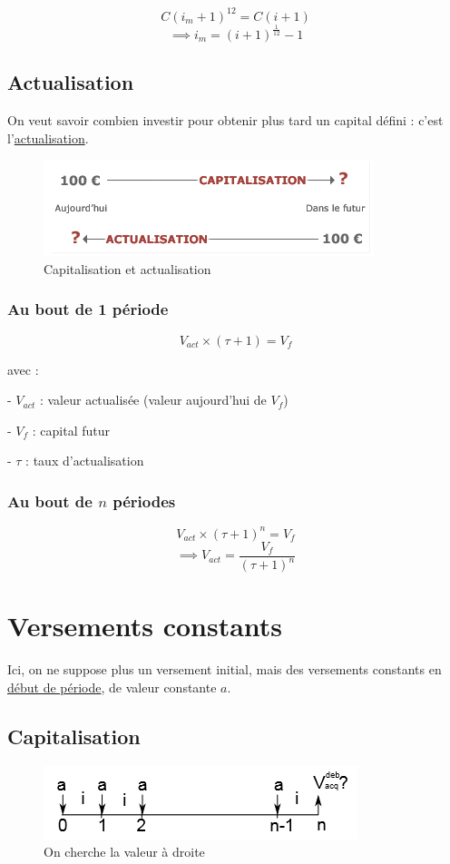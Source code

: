 \documentclass{article}
\begin{document}
$$C(i_m+1)^{12} = C(i+1)$$ $$\implies \boxed{i_m = (i+1)^{\frac{1}{12}} - 1}$$


\subsection{Actualisation}
On veut savoir combien investir pour obtenir plus tard un capital défini : c'est l'\underline{actualisation}.


\begin{figure}[h]
    \centering
    \includegraphics{capi-vs-actu.png}
    \\Capitalisation et actualisation
\end{figure}

\subsubsection{Au bout de 1 période}
$$V_{act} \times(\tau+1)= V_f$$

avec :

- $V_{act}$ : valeur actualisée (valeur aujourd'hui de $V_f$)

- $V_f$ : capital futur

- $\tau$ : taux d'actualisation

\subsubsection{Au bout de $n$ périodes}
$$V_{act} \times(\tau+1)^n= V_f$$
$$\implies \boxed{V_{act} = \dfrac{V_f}{(\tau+1)^n}}$$


\section{Versements constants}
Ici, on ne suppose plus un versement initial, mais des versements constants en \underline{début de période}, de valeur constante $a$.

\subsection{Capitalisation}

\begin{figure}[H]
    \centering
    \includegraphics{versement-constant.png}
    \\On cherche la valeur à droite
\end{figure}
\end{document}
